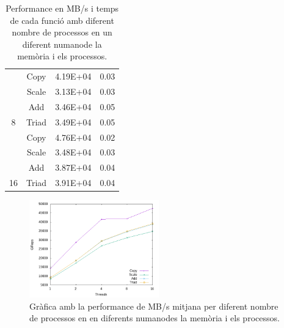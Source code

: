 \begin{table}[h]
\begin{tabular}{cccc}
                     & \cellcolor[HTML]{EFEFEF}Copy & \cellcolor[HTML]{EFEFEF}4.19E+04 & \cellcolor[HTML]{EFEFEF}0.03 \\
                     & Scale                        & 3.13E+04                         & 0.03                         \\
                     & \cellcolor[HTML]{EFEFEF}Add  & \cellcolor[HTML]{EFEFEF}3.46E+04 & \cellcolor[HTML]{EFEFEF}0.05 \\ 
\multirow{-4}{*}{8}  & Triad                        & 3.49E+04                         & 0.05                         \\ \hline
                     & \cellcolor[HTML]{EFEFEF}Copy & \cellcolor[HTML]{EFEFEF}4.76E+04 & \cellcolor[HTML]{EFEFEF}0.02 \\
                     & Scale                        & 3.48E+04                         & 0.03                         \\
                     & \cellcolor[HTML]{EFEFEF}Add  & \cellcolor[HTML]{EFEFEF}3.87E+04 & \cellcolor[HTML]{EFEFEF}0.04 \\
\multirow{-4}{*}{16} & Triad                        & 3.91E+04                         & 0.04                         \\ \hline
\end{tabular}
    \caption{Performance en MB/s i temps de cada funció amb diferent nombre de processos en un diferent numanode la memòria i els processos.}
    \label{tab:stream_binding_diff_perf}
\end{table}

\begin{figure}
    \centering
    \includegraphics[width=0.5\textwidth]{img/stream_binding_one_diff_grafica.png}
    \caption{Gràfica amb la performance de MB/s mitjana per diferent nombre de processos en en diferents numanodes la memòria i els processos.}
    \label{fig:stream_binding_one_diff_perf}
\end{figure}

